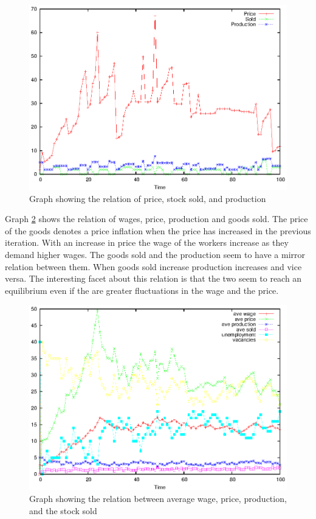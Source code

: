 \documentclass[a4paper,11pt]{article}
\begin{document}
\begin{figure}
\begin{center}
\includegraphics*[width = \linewidth]{g1.eps}
\caption{Graph showing the relation of price, stock sold, and
production} \label{fig:g1}
\end{center}
\end{figure}

Graph \ref{fig:g2} shows the relation of wages, price, production
and goods sold. The price of the goods denotes a price inflation
when the price has increased in the previous iteration. With an
increase in price the wage of the workers increase as they demand
higher wages. The goods sold and the production seem to have a
mirror relation between them. When goods sold increase production
increases and vice versa. The interesting facet about this relation
is that the two seem to reach an equilibrium even if the are greater
fluctuations in the wage and the price.

\begin{figure}
\begin{center}
\includegraphics*[width = \linewidth]{g2.eps}
\caption{Graph showing the relation between average wage,
price, production, and the stock sold} \label{fig:g2}
\end{center}
\end{figure}
\end{document}
